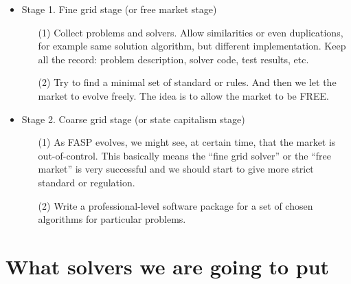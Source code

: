 \documentclass[11pt]{memoir}
\begin{document}
\begin{itemize}

\item Stage 1. Fine grid stage (or free market stage)

\begin{enumerate}
\item[(1)] Collect problems and solvers. Allow similarities or even duplications, for example same solution algorithm, but different implementation. Keep all the record: problem description, solver code, test results, etc.
%
\item[(2)] Try to find a minimal set of standard or rules. And then we let the market to evolve freely. The idea is to allow the market to be FREE.
\end{enumerate}

\item Stage 2. Coarse grid stage (or state capitalism stage)

\begin{enumerate}
\item[(1)] As FASP evolves, we might see, at certain time, that the market is out-of-control. This basically means the ``fine grid solver'' or the ``free market'' is very successful and we should start to give more strict standard or regulation.
%
\item[(2)] Write a professional-level software package for a set of chosen algorithms for particular problems.
\end{enumerate}
\end{itemize}

\section{What solvers we are going to put}\label{sec:idea}
\end{document}
